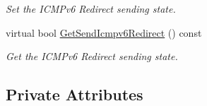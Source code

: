 \begin{DoxyCompactItemize}
\begin{DoxyCompactList}\small\item\em Set the I\+C\+M\+Pv6 Redirect sending state. \end{DoxyCompactList}\item 
virtual bool \hyperlink{classns3_1_1Ipv6L3Protocol_a4445c0e64ff312aedff3c5644fd6e99d}{Get\+Send\+Icmpv6\+Redirect} () const 
\begin{DoxyCompactList}\small\item\em Get the I\+C\+M\+Pv6 Redirect sending state. \end{DoxyCompactList}\end{DoxyCompactItemize}
\subsection*{Private Attributes}
